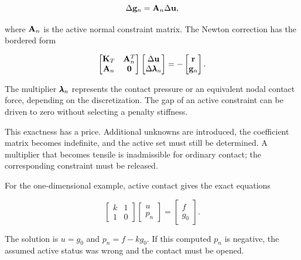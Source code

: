 \begin{equation}
    \Delta \mathbf{g}_n = \mathbf{A}_n \Delta \mathbf{u},
\end{equation}

where $ \mathbf{A}_n $ is the active normal constraint matrix. The Newton correction
has the bordered form

\begin{equation}\label{contact-lagrange-linear-system}
    \begin{bmatrix}
        \mathbf{K}_T & \mathbf{A}_n^T \\
        \mathbf{A}_n & \mathbf{0}
    \end{bmatrix}
    \begin{bmatrix}
        \Delta \mathbf{u} \\
        \Delta \pmb{\lambda}_n
    \end{bmatrix}
    = -
    \begin{bmatrix}
        \mathbf{r} \\
        \mathbf{g}_n
    \end{bmatrix}.
\end{equation}

The multiplier $ \pmb{\lambda}_n $ represents the contact pressure or an
equivalent nodal contact force, depending on the discretization. The gap of an
active constraint can be driven to zero without selecting a penalty stiffness.

This exactness has a price. Additional unknowns are introduced, the coefficient
matrix becomes indefinite, and the active set must still be determined. A
multiplier that becomes tensile is inadmissible for ordinary contact; the
corresponding constraint must be released.

For the one-dimensional example, active contact gives the exact equations

\begin{equation}
    \begin{bmatrix}
        k & 1 \\
        1 & 0
    \end{bmatrix}
    \begin{bmatrix}
        u \\
        p_n
    \end{bmatrix}
    =
    \begin{bmatrix}
        f \\
        g_0
    \end{bmatrix}.
\end{equation}

The solution is $ u=g_0 $ and $ p_n=f-k g_0 $. If this computed $ p_n $ is
negative, the assumed active status was wrong and the contact must be opened.


